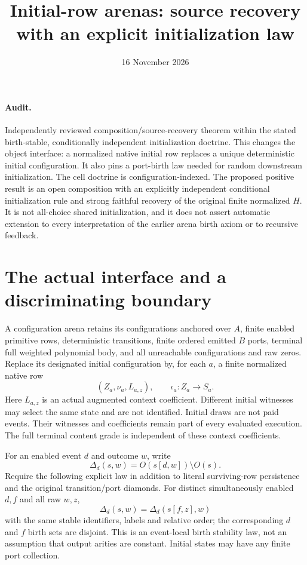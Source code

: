 \documentclass[11pt]{article}
\title{Initial-row arenas: source recovery with an explicit initialization law}
\date{16 November 2026}
\begin{document}
\maketitle
\paragraph{Audit.} Independently reviewed composition/source-recovery theorem within the stated birth-stable, conditionally independent initialization doctrine. This changes the object interface: a normalized native initial row replaces a unique deterministic initial configuration. It also pins a port-birth law needed for random downstream initialization. The cell doctrine is configuration-indexed. The proposed positive result is an open composition with an explicitly independent conditional initialization rule and strong faithful recovery of the original finite normalized $H$. It is not all-choice shared initialization, and it does not assert automatic extension to every interpretation of the earlier arena birth axiom or to recursive feedback.

\section{The actual interface and a discriminating boundary}
A configuration arena retains its configurations anchored over $A$, finite enabled primitive rows, deterministic transitions, finite ordered emitted $B$ ports, terminal full weighted polynomial body, and all unreachable configurations and raw zeros. Replace its designated initial configuration by, for each $a$, a finite normalized native row
\[
 (Z_a,\nu_a,L_{a,z}),\qquad \iota_a:Z_a\longrightarrow S_a.
\]
Here $L_{a,z}$ is an actual augmented context coefficient. Different initial witnesses may select the same state and are not identified. Initial draws are not paid events. Their witnesses and coefficients remain part of every evaluated execution. The full terminal content grade is independent of these context coefficients.

For an enabled event $d$ and outcome $w$, write
\[
 \Delta_d(s,w)=O(s[d,w])\setminus O(s).
\]
Require the following explicit law in addition to literal surviving-row persistence and the original transition/port diamonds. For distinct simultaneously enabled $d,f$ and all raw $w,z$,
\[
 \Delta_d(s,w)=\Delta_d(s[f,z],w)                         \tag{B}
\]
with the same stable identifiers, labels and relative order; the corresponding $d$ and $f$ birth sets are disjoint. This is an event-local birth stability law, not an assumption that output arities are constant. Initial states may have any finite port collection.
\end{document}
